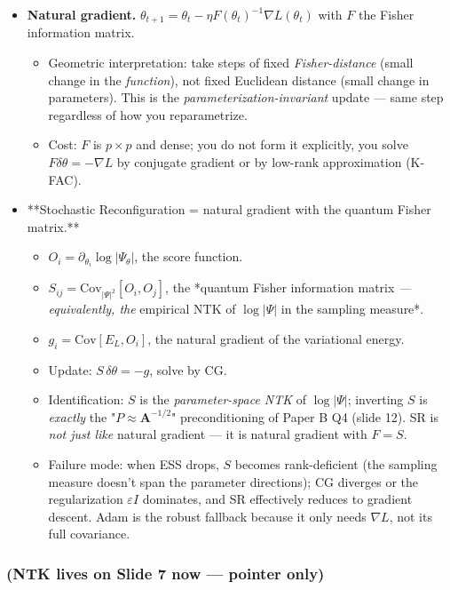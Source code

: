 \documentclass[11pt]{article}
\begin{document}
\begin{itemize}
\begin{itemize}
$\omega$.
\end{itemize}
\item \textbf{Natural gradient.} $\theta_{t+1} = \theta_t - \eta F(\theta_t)^{-1}
  \nabla L(\theta_t)$ with $F$ the Fisher information matrix.
\begin{itemize}
\item Geometric interpretation: take steps of fixed \emph{Fisher-distance}
(small change in the \emph{function}), not fixed Euclidean distance (small
change in parameters). This is the \emph{parameterization-invariant}
update --- same step regardless of how you reparametrize.
\item Cost: $F$ is $p \times p$ and dense; you do not form it explicitly,
you solve $F \delta\theta = -\nabla L$ by conjugate gradient or by
low-rank approximation (K-FAC).
\end{itemize}
\item **Stochastic Reconfiguration = natural gradient with the quantum Fisher
matrix.**
\begin{itemize}
\item $O_i = \partial_{\theta_i} \log|\Psi_\theta|$, the score function.
\item $S_{ij} = \mathrm{Cov}_{|\Psi|^2}[O_i, O_j]$, the *quantum Fisher
information matrix\emph{ --- equivalently, the }empirical NTK of
$\log|\Psi|$ in the sampling measure*.
\item $g_i = \mathrm{Cov}[E_L, O_i]$, the natural gradient of the variational
energy.
\item Update: $S \, \delta\theta = -g$, solve by CG.
\item Identification: $S$ is the \emph{parameter-space NTK} of $\log|\Psi|$;
inverting $S$ is \emph{exactly} the "$P \approx \mathbf A^{-1/2}$"
preconditioning of Paper B Q4 (slide 12). SR is \emph{not just like}
natural gradient --- it is natural gradient with $F = S$.
\item Failure mode: when ESS drops, $S$ becomes rank-deficient (the
sampling measure doesn't span the parameter directions); CG diverges
or the regularization $\varepsilon I$ dominates, and SR effectively
reduces to gradient descent. Adam is the robust fallback because it
only needs $\nabla L$, not its full covariance.
\end{itemize}
\end{itemize}
\subsubsection*{(NTK lives on Slide 7 now --- pointer only)}
\end{document}
